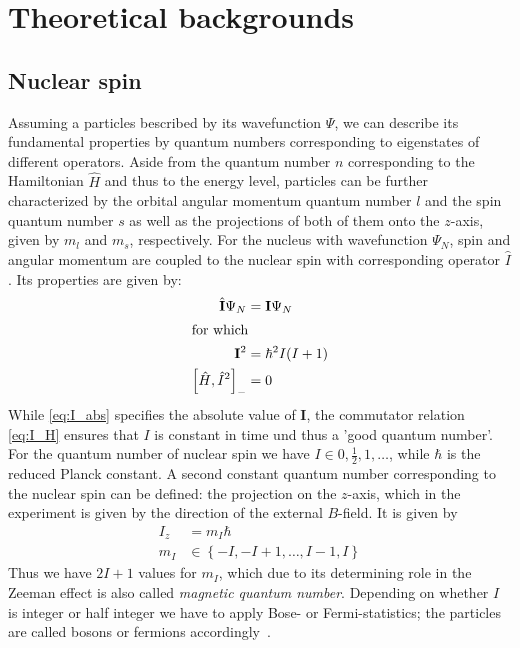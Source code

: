 \section{Theoretical backgrounds}
\subsection{Nuclear spin}
Assuming a particles bescribed by its wavefunction $\Psi$, we can describe 
its fundamental properties by quantum numbers corresponding to eigenstates
of different operators. Aside from the quantum number $n$ corresponding to the 
Hamiltonian $\hat{H}$ and thus to the energy level, particles can be further characterized 
by the orbital angular momentum quantum number $l$ and the spin quantum number 
$s$ as well as the projections of both of them onto the $z$-axis, given by 
$m_l$ and $m_s$, respectively. For the nucleus with wavefunction $\Psi_N$, 
spin and angular momentum are coupled to the 
nuclear spin with corresponding operator $\hat{I}$. Its properties are given by:
\begin{align}
    \hat{\mathbf{I}} \Psi_N &= \mathbf{I} \Psi_N \\ 
\intertext{for which}
    \mathbf{I}^2 &= \hbar^2 I(I + 1)
    \label{eq:I_abs}\\
    \left[\hat{H}, \hat{I}^2\right]_- &= 0 
    \label{eq:I_H}\\
\end{align}
While \eqref{eq:I_abs} specifies the absolute value of $\mathbf{I}$, the commutator relation 
\eqref{eq:I_H} ensures that $I$ is constant in time und thus a 'good quantum number'.
For the quantum number of nuclear spin we have $I \in {0, \frac{1}{2}, 1, \ldots}$, while $\hbar$ is the 
reduced Planck constant. A second constant quantum number corresponding to the nuclear spin can be defined:
the projection on the $z$-axis, which in the experiment is given by the direction of the external $B$-field.
It is given by
\begin{align}
    I_z &= m_I \hbar \\
    m_I &\in \left\{-I, -I + 1, \ldots, I - 1, I\right\}
\end{align}
Thus we have $2I + 1$ values for $m_I$, which due to its determining role in the Zeeman effect is 
also called \emph{magnetic quantum number}. Depending on whether $I$ is integer or half integer
we have to apply Bose- or Fermi-statistics; the particles are called bosons or fermions 
accordingly~\cite{dem}.

